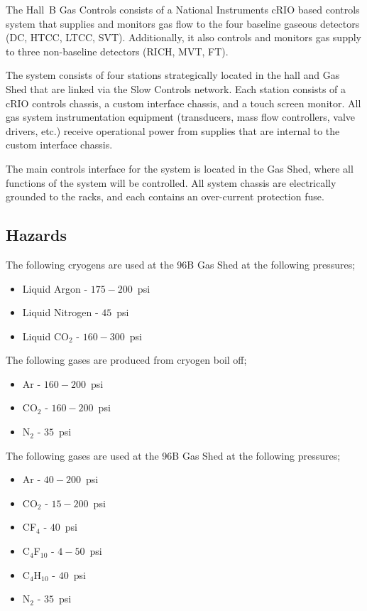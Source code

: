 The Hall~B Gas Controls consists of a National Instruments cRIO based controls system 
that supplies and monitors gas flow to the four baseline gaseous detectors (DC, HTCC, 
LTCC, SVT). Additionally, it also controls and monitors gas supply to three non-baseline 
detectors (RICH, MVT, FT). 

The system consists of four stations strategically located in the hall and Gas Shed that 
are linked via the Slow Controls network. Each station consists of a cRIO controls chassis, 
a custom interface chassis, and a touch screen monitor. All gas system instrumentation 
equipment (transducers, mass flow controllers, valve drivers, etc.) receive operational 
power from supplies that are internal to the custom interface chassis. 

The main controls interface for the system is located in the Gas Shed, where all functions 
of the system will be controlled. All system chassis are electrically grounded to the racks, 
and each contains an over-current protection fuse. 

\subsection{Hazards} 

The following cryogens are used at the 96B Gas Shed at the following pressures;
\begin{itemize}
\item Liquid Argon - $175 - 200$~psi
\item Liquid Nitrogen - $45$~psi
\item Liquid CO$_2$ - $160 - 300$~psi
\end{itemize}

The following gases are produced from cryogen boil off;

\begin{itemize}
\item Ar - $160 - 200$~psi
\item CO$_2$ - $160 - 200$~psi
\item N$_2$ - $35$~psi
\end{itemize}

The following gases are used at the 96B Gas Shed at the following pressures;

\begin{itemize}
\item Ar - $40 - 200$~psi
\item CO$_2$ - $15-200$~psi
\item CF$_4$ - $40$~psi
\item C$_4$F$_{10}$ - $4 - 50$~psi
\item C$_4$H$_{10}$ - $40$~psi
\item N$_2$ - $35$~psi
\end{itemize}

